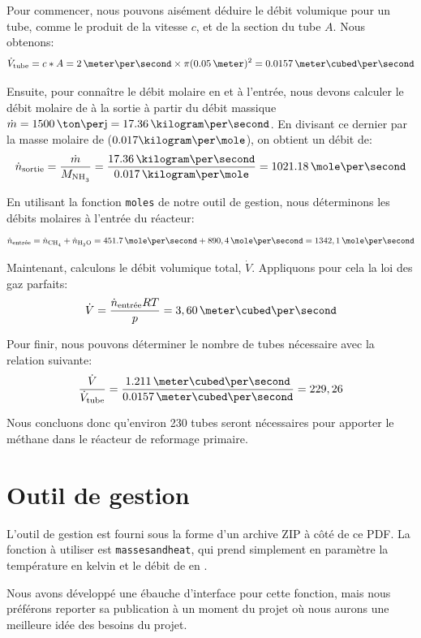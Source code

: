 \documentclass[a4paper,12pt]{article}
\begin{document}
Pour commencer, nous pouvons aisément déduire le débit volumique pour un tube,
comme le produit de la vitesse $c$, et de la section du tube $A$.
Nous obtenons:
\begin{equation*}
\dot{V}\ind{tube} = c*A = 2\,\meter\per\second \times \pi(0.05\,\meter)^2
= 0.0157\,\meter\cubed\per\second
\end{equation*}

Ensuite, pour connaître le débit molaire en  et  à l'entrée, nous devons calculer le débit molaire de  à la sortie
à partir du débit massique $\dot{m} = 1500\,\ton\per\jour = 17.36\,\kilogram\per\second$.
En divisant ce dernier par la masse molaire de  ($0.017\kilogram\per\mole$),
on obtient un débit de:
\begin{equation*}
\dot{n}\ind{sortie} = \frac{\dot{m}}{M_{\ce{NH3}}}
= \frac{17.36\,\kilogram\per\second}{0.017\,\kilogram\per\mole}
= 1021.18\,\mole\per\second
\end{equation*}

En utilisant la fonction \texttt{moles} de notre outil de gestion,
nous déterminons les débits molaires à l'entrée du réacteur:
\begin{equation*}
\dot{n}\ind{entrée} =  \dot{n}\ind{\ce{CH4}}+ \dot{n}\ind{\ce{H2O}}=451.7\,\mole\per\second + 890,4\,\mole\per\second = 1342,1 \,\mole\per\second
\end{equation*}

Maintenant, calculons le débit volumique total, $\dot{V}$.
Appliquons pour cela la loi des gaz parfaits:
\begin{equation*}
\dot{V} = \frac{\dot{n}\ind{entrée}RT}{p} = 3,60\,\meter\cubed\per\second
\end{equation*}

Pour finir, nous pouvons déterminer
le nombre de tubes nécessaire avec la relation suivante:
\begin{equation*}
\frac{\dot{V}}{\dot{V}\ind{tube}}
= \frac{1.211\,\meter\cubed\per\second}{0.0157\,\meter\cubed\per\second} = 229,26
\end{equation*}

Nous concluons donc qu'environ 230 tubes seront nécessaires pour apporter le méthane
dans le réacteur de reformage primaire.

\section{Outil de gestion}

L'outil de gestion est fourni sous la forme d'un archive ZIP à côté de ce PDF.
La fonction à utiliser est \texttt{masses\textunderscore and\textunderscore heat},
qui prend simplement en paramètre la température en kelvin et le débit
de  en \kilogram\per\second.

Nous avons développé une ébauche d'interface pour cette fonction,
mais nous préférons reporter sa publication à un moment du projet où nous aurons
une meilleure idée des besoins du projet.

\printbibliography[heading=bibintoc]
\end{document}
